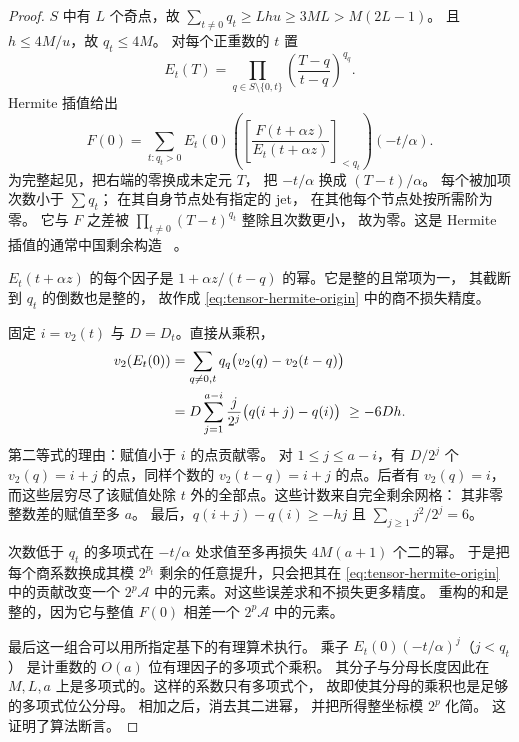 \begin{proof}
$S$ 中有 $L$ 个奇点，故
$\sum_{t\ne0}q_t\ge Lhu\ge3ML>M(2L-1)$。
且 $h\le4M/u$，故 $q_t\le4M$。
对每个正重数的 $t$ 置
\[
 E_t(T)=\prod_{q\in S\setminus\{0,t\}}
                    \left(\frac{T-q}{t-q}\right)^{q_q}.
\]
Hermite 插值给出
\begin{equation}\label{eq:tensor-hermite-origin}
 F(0)=\sum_{t:q_t>0}E_t(0)
       \left(\left[\frac{F(t+\alpha z)}
                            {E_t(t+\alpha z)}\right]_{<q_t}\right)
                            (-t/\alpha).
\end{equation}
为完整起见，把右端的零换成未定元 $T$，
把 $-t/\alpha$ 换成 $(T-t)/\alpha$。
每个被加项次数小于 $\sum q_t$；
在其自身节点处有指定的 jet，
在其他每个节点处按所需阶为零。
它与 $F$ 之差被
$\prod_{t\ne0}(T-t)^{q_t}$ 整除且次数更小，
故为零。这是 Hermite 插值的通常中国剩余构造
~\cite[Section~5.6]{vzGG13}。

$E_t(t+\alpha z)$ 的每个因子是
$1+\alpha z/(t-q)$ 的幂。它是整的且常项为一，
其截断到 $q_t$ 的倒数也是整的，
故作成 \eqref{eq:tensor-hermite-origin}
中的商不损失精度。

固定 $i=v_2(t)$ 与 $D=D_t$。直接从乘积，
\begin{align}
 v_2(E_t(0))
 &=\sum_{q\ne0,t}q_q\bigl(v_2(q)-v_2(t-q)\bigr)\notag\\
 &=D\sum_{j=1}^{a-i}\frac{j}{2^j}
                           \bigl(q(i+j)-q(i)\bigr)
 \ \ge -6Dh. \label{eq:tensor-hermite-loss}
\end{align}
第二等式的理由：赋值小于 $i$ 的点贡献零。
对 $1\le j\le a-i$，有 $D/2^j$
个 $v_2(q)=i+j$ 的点，同样个数的
$v_2(t-q)=i+j$ 的点。后者有 $v_2(q)=i$，
而这些层穷尽了该赋值处除 $t$
外的全部点。这些计数来自完全剩余网格：
其非零整数差的赋值至多 $a$。
最后，$q(i+j)-q(i)\ge-hj$ 且
$\sum_{j\ge1}j^2/2^j=6$。

次数低于 $q_t$ 的多项式在 $-t/\alpha$
处求值至多再损失 $4M(a+1)$ 个二的幂。
于是把每个商系数换成其模 $2^{p_t}$
剩余的任意提升，只会把其在
\eqref{eq:tensor-hermite-origin}
中的贡献改变一个 $2^p\mathcal A$
中的元素。对这些误差求和不损失更多精度。
重构的和是整的，因为它与整值 $F(0)$
相差一个 $2^p\mathcal A$ 中的元素。

最后这一组合可以用所指定基下的有理算术执行。
乘子 $E_t(0)(-t/\alpha)^j$（$j<q_t$）
是计重数的 $O(a)$ 位有理因子的多项式个乘积。
其分子与分母长度因此在 $M,L,a$
上是多项式的。这样的系数只有多项式个，
故即使其分母的乘积也是足够的多项式位公分母。
相加之后，消去其二进幂，
并把所得整坐标模 $2^p$ 化简。
这证明了算法断言。
\end{proof}

